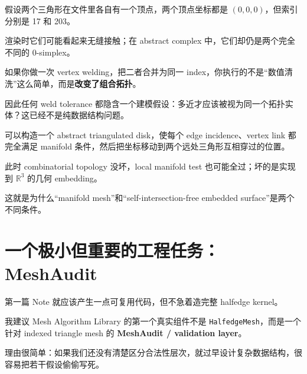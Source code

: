 \documentclass[UTF8,11pt]{ctexart}
\newcommand{\code}[1]{\texttt{#1}}
\begin{document}
\begin{failurecase}[：坐标重合不等于拓扑粘合]
假设两个三角形在文件里各自有一个顶点，两个顶点坐标都是 $(0,0,0)$，但索引分别是 17 和 203。

渲染时它们可能看起来无缝接触；在 abstract complex 中，它们却仍是两个完全不同的 0-simplex。

如果你做一次 vertex welding，把二者合并为同一 index，你执行的不是“数值清洗”这么简单，而是\textbf{改变了组合拓扑}。

因此任何 weld tolerance 都隐含一个建模假设：多近才应该被视为同一个拓扑实体？这已经不是纯数据结构问题。
\end{failurecase}

\begin{failurecase}[：组合流形不保证空间中没有自交]
可以构造一个 abstract triangulated disk，使每个 edge incidence、vertex link 都完全满足 manifold 条件，然后把坐标移动到两个远处三角形互相穿过的位置。

此时 combinatorial topology 没坏，local manifold test 也可能全过；坏的是实现到 $\mathbb R^3$ 的几何 embedding。

这就是为什么“manifold mesh”和“self-intersection-free embedded surface”是两个不同条件。
\end{failurecase}

\section{一个极小但重要的工程任务：MeshAudit}

第一篇 Note 就应该产生一点可复用代码，但不急着造完整 halfedge kernel。

我建议 Mesh Algorithm Library 的第一个真实组件不是 \code{HalfedgeMesh}，而是一个针对 indexed triangle mesh 的 \textbf{MeshAudit / validation layer}。

理由很简单：如果我们还没有清楚区分合法性层次，就过早设计复杂数据结构，很容易把若干假设偷偷写死。
\end{document}
